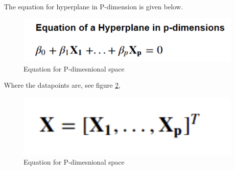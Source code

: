 \documentclass[format=sigconf]{acmart}
\begin{document}
The equation for hyperplane in P-dimension is given below.
\begin{figure}[H]
    \centering
    \includegraphics[scale=0.40]{SVM_Equation_for_p-dimension.png}
    \caption{Equation for P-dimesnional space}
    \label{fig:svm_dimension_equation}
\end{figure}

Where the datapoints are, see figure \ref{fig:svm_datapoints},
\begin{figure}[H]
    \centering
    \includegraphics[scale=0.40]{svm_data_points.png}
    \caption{Equation for P-dimesnional space}
    \label{fig:svm_datapoints}
\end{figure}
\end{document}
